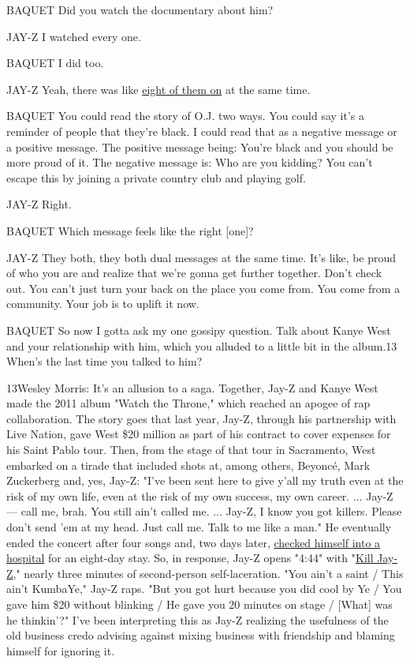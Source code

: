 BAQUET Did you watch the documentary about him?

JAY-Z I watched every one.

BAQUET I did too.

JAY-Z Yeah, there was like
\href{https://www.nytimes3xbfgragh.onion/2016/06/26/arts/television/oj-simpson-trial-made-in-america.html}{eight
of them on} at the same time.

BAQUET You could read the story of O.J. two ways. You could say it's a
reminder of people that they're black. I could read that as a negative
message or a positive message. The positive message being: You're black
and you should be more proud of it. The negative message is: Who are you
kidding? You can't escape this by joining a private country club and
playing golf.

JAY-Z Right.

BAQUET Which message feels like the right {[}one{]}?

JAY-Z They both, they both dual messages at the same time. It's like, be
proud of who you are and realize that we're gonna get further together.
Don't check out. You can't just turn your back on the place you come
from. You come from a community. Your job is to uplift it now.

BAQUET So now I gotta ask my one gossipy question. Talk about Kanye West
and your relationship with him, which you alluded to a little bit in the
album.13 When's the last time you talked to him?

13Wesley Morris: It's an allusion to a saga. Together, Jay-Z and Kanye
West made the 2011 album "Watch the Throne," which reached an apogee of
rap collaboration. The story goes that last year, Jay-Z, through his
partnership with Live Nation, gave West \$20 million as part of his
contract to cover expenses for his Saint Pablo tour. Then, from the
stage of that tour in Sacramento, West embarked on a tirade that
included shots at, among others, Beyoncé, Mark Zuckerberg and, yes,
Jay-Z: "I've been sent here to give y'all my truth even at the risk of
my own life, even at the risk of my own success, my own career. ...
Jay-Z --- call me, brah. You still ain't called me. ... Jay-Z, I know
you got killers. Please don't send 'em at my head. Just call me. Talk to
me like a man." He eventually ended the concert after four songs and,
two days later,
\href{https://www.nytimes3xbfgragh.onion/2016/11/21/arts/music/kanye-west-hospitalized-exhaustion.html}{checked
himself into a hospital} for an eight-day stay. So, in response, Jay-Z
opens "4:44" with
"\href{https://www.youtube.com/watch?v=rQLVU4j7Ejo}{Kill Jay-Z}," nearly
three minutes of second-person self-laceration. "You ain't a saint /
This ain't KumbaYe," Jay-Z raps. "But you got hurt because you did cool
by Ye / You gave him \$20 without blinking / He gave you 20 minutes on
stage / {[}What{]} was he thinkin'?" I've been interpreting this as
Jay-Z realizing the usefulness of the old business credo advising
against mixing business with friendship and blaming himself for ignoring
it.

